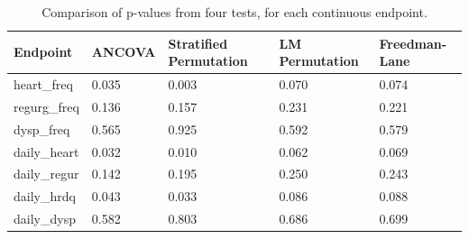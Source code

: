 \documentclass[12pt]{article}
\begin{document}
\begin{table}[]
\centering
\label{tab:clinical_pvalues}
\begin{tabular}{l|LLLL}
Endpoint      & ANCOVA & Stratified Permutation & LM Permutation & Freedman-Lane \\ \hline
heart\_freq   & 0.035                      & 0.003                                                                                & 0.070                                                                        & 0.074                                                                       \\
regurg\_freq  & 0.136                      & 0.157                                                                                & 0.231                                                                        & 0.221                                                                        \\
dysp\_freq    & 0.565                      & 0.925                                                                               & 0.592                                                                        & 0.579                                                                        \\
daily\_heart & 0.032                      & 0.010                                                                                & 0.062                                                                        & 0.069                                                                        \\
daily\_regur  & 0.142                      & 0.195                                                                                & 0.250                                                                        & 0.243                                                                        \\
daily\_hrdq   & 0.043                      & 0.033                                                                                & 0.086                                                                        & 0.088                                                                        \\
daily\_dysp   & 0.582                      & 0.803                                                                                & 0.686                                                                        & 0.699                                                                        \\
\hline
\end{tabular}
\caption{Comparison of p-values from four tests, for each continuous endpoint.} 
\end{table}
\end{document}
